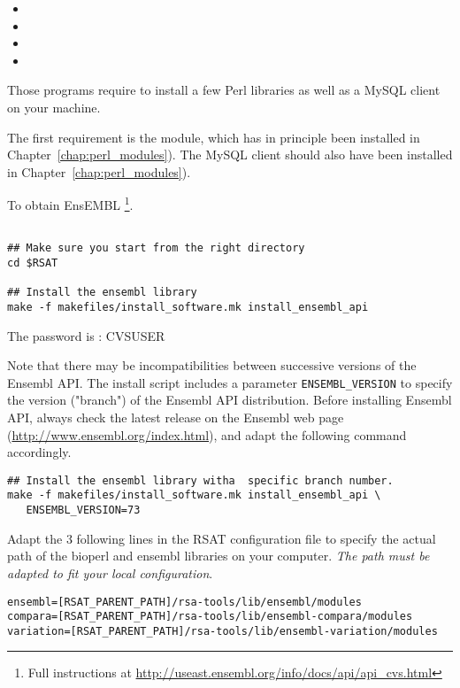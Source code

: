 \documentclass[12pt,a4paper, oneside]{scrreprt} %
\begin{document}
\begin{itemize}
\item {}
\item {}
\item {} 
\item {}
\end{itemize}

Those programs require to install a few Perl libraries as well as a
MySQL client on your machine. 

The first requirement is the  module, which has in
principle been installed in Chapter~\ref{chap:perl_modules}). The MySQL client should also have been installed in Chapter~\ref{chap:perl_modules}).


To obtain EnsEMBL \footnote{Full instructions at
  \url{http://useast.ensembl.org/info/docs/api/api_cvs.html}}.

\begin{lstlisting}

## Make sure you start from the right directory
cd $RSAT

## Install the ensembl library
make -f makefiles/install_software.mk install_ensembl_api 
\end{lstlisting}

The password is : CVSUSER


Note that there may be incompatibilities between successive versions
of the Ensembl API. The install script includes a parameter
\texttt{ENSEMBL\_VERSION} to specify the version ("branch") of the
Ensembl API distribution. Before installing Ensembl API, always check
the latest release on the Ensembl web page
(\url{http://www.ensembl.org/index.html}), and adapt the following
command accordingly.

\begin{lstlisting}
## Install the ensembl library witha  specific branch number.
make -f makefiles/install_software.mk install_ensembl_api \
   ENSEMBL_VERSION=73
\end{lstlisting}

Adapt the 3 following lines in the RSAT configuration file
 to specify the actual path of the bioperl
and ensembl libraries on your computer. \emph{The path must be adapted
  to fit your local configuration}.

\begin{lstlisting}
ensembl=[RSAT_PARENT_PATH]/rsa-tools/lib/ensembl/modules
compara=[RSAT_PARENT_PATH]/rsa-tools/lib/ensembl-compara/modules
variation=[RSAT_PARENT_PATH]/rsa-tools/lib/ensembl-variation/modules
\end{lstlisting}
\end{document}
